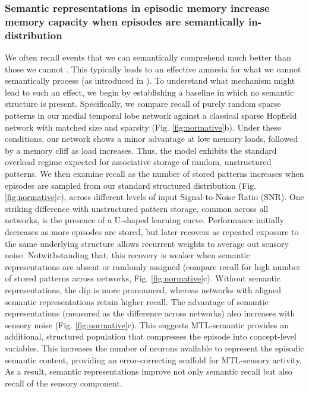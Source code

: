 \documentclass{article}
\begin{document}
\subsubsection*{Semantic representations in episodic memory increase memory capacity when episodes are semantically in-distribution}
We often recall events that we can semantically comprehend much better than those we cannot . This typically leads to an effective amnesia for what we cannot semantically process (as introduced in ). To understand what mechanism might lead to such an effect, we begin by establishing a baseline in which no semantic structure is present. Specifically, we compare recall of purely random sparse patterns in our medial temporal lobe network against a classical sparse Hopfield network with matched size and sparsity (Fig. \ref{fig:normative}b). Under these conditions, our network shows a minor advantage at low memory loads, followed by a memory cliff as load increases. Thus, the model exhibits the standard overload regime expected for associative storage of random, unstructured patterns.
\newline\newline
We then examine recall as the number of stored patterns increases when episodes are sampled from our standard structured distribution (Fig. \ref{fig:normative}c), across different levels of input Signal-to-Noise Ratio (SNR). One striking difference with unstructured pattern storage, common across all networks, is the presence of a U-shaped learning curve. Performance initially decreases as more episodes are stored, but later recovers as repeated exposure to the same underlying structure allows recurrent weights to average out sensory noise.
\newline\newline
Notwithstanding that, this recovery is weaker when semantic representations are absent or randomly assigned (compare recall for high number of stored patterns across networks, Fig. \ref{fig:normative}c). Without semantic representations, the dip is more pronounced, whereas networks with aligned semantic representations retain higher recall. The advantage of semantic representations (measured as the difference across networks) also increases with sensory noise (Fig. \ref{fig:normative}c). This suggests MTL-semantic provides an additional, structured population that compresses the episode into concept-level variables. This increases the number of neurons available to represent the episodic semantic content, providing an error-correcting scaffold for MTL-sensory activity. As a result, semantic representations improve not only semantic recall but also recall of the sensory component.
\end{document}
